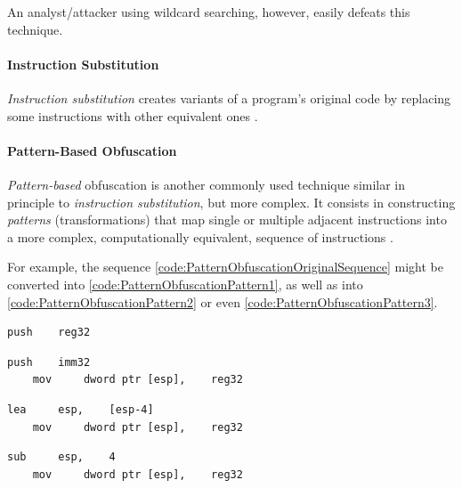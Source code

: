 \documentclass[pdfa%
,cucitura%
]{toptesi}
\begin{document}
An analyst/attacker using wildcard searching, however, easily defeats this technique.

\paragraph{Instruction Substitution}
\textit{Instruction substitution} creates variants of a program's original code by replacing some instructions with other equivalent ones \cite{YouMalwareOT}.

\paragraph{Pattern-Based Obfuscation}
\textit{Pattern-based} obfuscation is another commonly used technique similar in principle to \textit{instruction substitution}, but more complex. It consists in constructing \textit{patterns} (transformations) that map single or multiple adjacent instructions into a more complex, computationally equivalent, sequence of instructions \cite{DangPRE}.

For example, the sequence \ref{code:PatternObfuscationOriginalSequence} might be converted into \ref{code:PatternObfuscationPattern1}, as well as into \ref{code:PatternObfuscationPattern2} or even \ref{code:PatternObfuscationPattern3}.

\begin{lstlisting}[caption={Original sequence}, label=code:PatternObfuscationOriginalSequence, language={[x86masm]Assembler}, style=mystyle]
	push	reg32
\end{lstlisting}

\begin{lstlisting}[caption={Obfuscation using pattern 1}, label=code:PatternObfuscationPattern1, language={[x86masm]Assembler}, style=mystyle]
	push	imm32
	mov		dword ptr [esp],	reg32
\end{lstlisting}

\begin{lstlisting}[caption={Obfuscation using pattern 2}, label=code:PatternObfuscationPattern2, language={[x86masm]Assembler}, style=mystyle]
	lea		esp,	[esp-4]
	mov		dword ptr [esp],	reg32
\end{lstlisting}

\begin{lstlisting}[caption={Obfuscation using pattern 3}, label=code:PatternObfuscationPattern3, language={[x86masm]Assembler}, style=mystyle]
	sub		esp,	4
	mov		dword ptr [esp],	reg32
\end{lstlisting}
\end{document}
